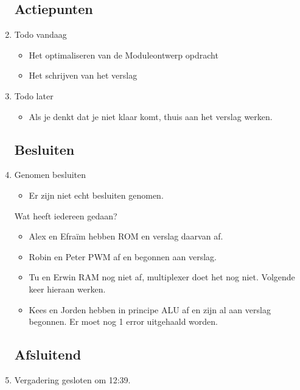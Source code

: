 \documentclass{article}
\begin{document}
\begin{enumerate}
	\subsection*{Actiepunten}
	\item Todo vandaag
	\begin{itemize}
		\item Het optimaliseren van de Moduleontwerp opdracht
		\item Het schrijven van het verslag
	\end{itemize}
	\item Todo later
	\begin{itemize}
		\item Als je denkt dat je niet klaar komt, thuis aan het verslag werken.
	\end{itemize}

	\subsection*{Besluiten}
	\item Genomen besluiten
	\begin{itemize}
		\item Er zijn niet echt besluiten genomen.
	\end{itemize}

Wat heeft iedereen gedaan?
\begin{itemize}
\item Alex en Efraïm hebben ROM en verslag daarvan af. 
\item Robin en Peter PWM af en begonnen aan verslag.
\item Tu en Erwin RAM nog niet af, multiplexer doet het nog niet. Volgende keer hieraan werken.
\item Kees en Jorden hebben in principe ALU af en zijn al aan verslag begonnen. Er moet nog 1 error uitgehaald worden. 
\end{itemize}
	\noindent 
	\subsection*{Afsluitend}
	\item Vergadering gesloten om 12:39.%

\end{enumerate}
\end{document}

